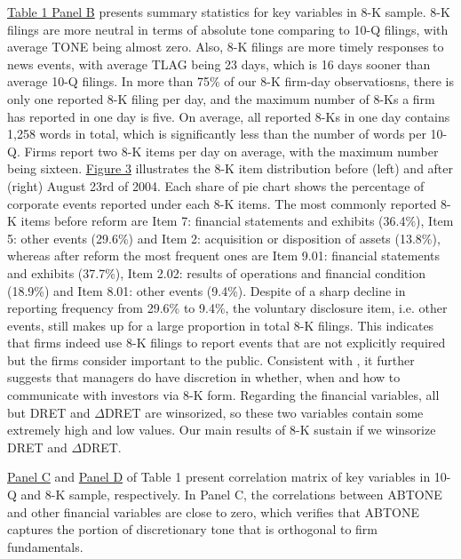 \documentclass[a4paper]{article}
\begin{document}
\begin{spacing}{2}
\hyperref[T1PB]{Table 1 Panel B} presents summary statistics for key variables in 8-K sample. 8-K filings are more neutral in terms of absolute tone comparing to 10-Q filings, with average TONE being almost zero. Also, 8-K filings are more timely responses to news events, with average TLAG being 23 days, which is 16 days sooner than average 10-Q filings. In more than 75\% of our 8-K firm-day observatiosns, there is only one reported 8-K filing per day, and the maximum number of 8-Ks a firm has reported in one day is five. On average, all reported 8-Ks in one day contains 1,258 words in total, which is significantly less than the number of words per 10-Q. Firms report two 8-K items per day on average, with the maximum number being sixteen. \hyperref[fig3]{Figure 3} illustrates the 8-K item distribution before (left) and after (right) August 23rd of 2004. Each share of pie chart shows the percentage of corporate events reported under each 8-K items. The most commonly reported 8-K items before reform are Item 7: financial statements and exhibits (36.4\%), Item 5: other events (29.6\%) and Item 2: acquisition or disposition of assets (13.8\%), whereas after reform the most frequent ones are Item 9.01: financial statements and exhibits (37.7\%), Item 2.02: results of operations and financial condition (18.9\%) and Item 8.01: other events (9.4\%). Despite of a sharp decline in reporting frequency from 29.6\% to 9.4\%, the voluntary disclosure item, i.e. other events, still makes up for a large proportion in total 8-K filings. This indicates that firms indeed use 8-K filings to report events that are not explicitly required but the firms consider important to the public. Consistent with \cite{baoManagersDiscloseWithhold2019}, it further suggests that managers do have discretion in whether, when and how to communicate with investors via 8-K form. Regarding the financial variables, all but DRET and $\Delta$DRET are winsorized, so these two variables contain some extremely high and low values. Our main results of 8-K sustain if we winsorize DRET and $\Delta$DRET.

\hyperref[T1PC]{Panel C} and \hyperref[T1PD]{Panel D} of Table 1 present correlation matrix of key variables in 10-Q and 8-K sample, respectively. In Panel C, the correlations between ABTONE and other financial variables are close to zero, which verifies that ABTONE captures the portion of discretionary tone that is orthogonal to firm fundamentals. 


\end{spacing}
\end{document}
